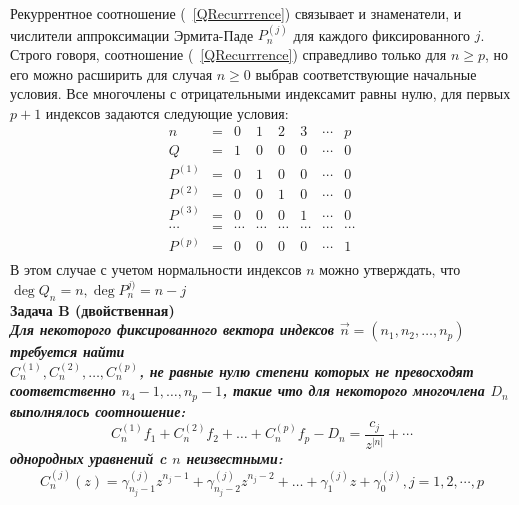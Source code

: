 Рекуррентное соотношение (~\ref{QRecurrrence}) связывает и
знаменатели, и числители аппроксимации Эрмита-Паде $P^{(j)}_n$
для каждого фиксированного $j$. Строго говоря, соотношение
(~\ref{QRecurrrence}) справедливо только для $n\geq{p}$, но его
можно расширить для случая $n\geq{0}$ выбрав соответствующие
начальные условия. Все многочлены с отрицательными индексамит
равны нулю, для первых $p+1$ индексов задаются следующие условия:
$$
\begin{array} {rcccccccccccccc}
n       & = & 0 & 1 & 2 & 3 & \cdots & p   \\
Q       & = & 1 & 0 & 0 & 0 & \cdots & 0    \\
P^{(1)} & = & 0 & 1 & 0 & 0 & \cdots & 0    \\
P^{(2)} & = & 0 & 0 & 1 & 0 & \cdots & 0    \\
P^{(3)} & = & 0 & 0 & 0 & 1 & \cdots & 0    \\
\cdots  & = & \cdots & \cdots & \cdots & \cdots & \cdots & \cdots   \\
P^{(p)} & = & 0 & 0 & 0 & 0 & \cdots & 1    \\
\end{array}
$$
В этом случае с учетом нормальности индексов $n$ можно утверждать, что $\deg Q_n=n, \deg P_n^{j)} = n-j$ \\
\bf Задача B (двойственная)\it \\ Для некоторого фиксированного
вектора индексов
$\overrightarrow{n}=(n_1,n_2,\ldots,n_p)$ требуется найти \\
$C^{(1)}_n,C^{(2)}_n,\ldots,C^{(p)}_n$, не равные нулю степени
которых не превосходят соответственно $n_4-1,\ldots, n_p-1$, такие
что для некоторого многочлена $D_n$ выполнялось соотношение: \rm
$$%
C^{(1)}_nf_1+C^{(2)}_nf_2+\ldots+C^{(p)}_nf_p-D_n=\frac{c_j}{z^{|n|}}+\cdots
$$%
однородных уравнений c $n$ неизвестными:
\begin{equation}
\label{CH0}
C_n^{(j)}(z)=\gamma^{(j)}_{n_j-1}z^{n_j-1}+\gamma^{(j)}_{n_j-2}z^{n_j-2}+\ldots+\gamma^{(j)}_{1}z+\gamma^{(j)}_{0},
j=1,2,\cdots,p
\end{equation}
